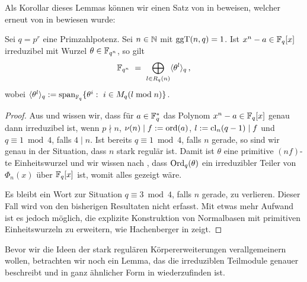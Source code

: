 Als Korollar dieses Lemmas können wir einen Satz von \citeauthor{semaev:1989}
\citeyear{semaev:1989} in 
\autocite{semaev:1989} beweisen, welcher erneut von \citeauthor{gao:1997}
\citeyear{gao:1997} in \autocite{gao:1997} bewiesen wurde:

\begin{satz}
  \label{satz:gao1}
  Sei $q = p^r$ eine Primzahlpotenz. Sei $n \in \mathbb{N}$ mit $\operatorname{ggT}(n,q)=1$.
  Ist $x^n - a \in \mathbb{F}_q[x]$ irreduzibel mit Wurzel $\theta\in \mathbb{F}_{q^n}$, so
  gilt 
  \[ \mathbb{F}_{q^n} \ =\  \bigoplus_{l\in R_q(n)} \langle \theta^l\rangle_q\,,\]
  wobei $\langle \theta^l\rangle_q := 
  \operatorname{span}_{\mathbb{F}_q}\{ \theta^i:\ i\in M_q(l\bmod n)\}$.
\end{satz}
\begin{proof}
  Aus  und 
  wissen wir, dass für $a \in \mathbb{F}_q^\ast$ das Polynom
  $x^n-a \in \mathbb{F}_q[x]$ genau dann irreduzibel ist, wenn
  $p\nmid n$, $\nu(n) \mid f := \operatorname{ord}(a)$, $l := \operatorname{cl}_n(q-1)\mid f$ und
  $q \equiv 1 \bmod 4$, falls $4\mid n$. 
  Ist bereits $q\equiv 1 \bmod 4$, falls $n$ gerade, so sind wir genau in der 
  Situation, dass $n$ stark regulär ist.
  Damit ist $\theta$ eine primitive $(nf)$-te Einheitswurzel und wir wissen
  nach , dass
  $\operatorname{Ord}_q(\theta)$ ein irreduzibler Teiler von $\Phi_n(x)$ über $\mathbb{F}_q[x]$ ist,
  womit alles gezeigt wäre.

  Es bleibt ein Wort zur Situation $q\equiv 3 \bmod 4$, falls $n$ gerade, zu
  verlieren. Dieser Fall wird von den bisherigen Resultaten nicht erfasst.
  Mit etwas mehr Aufwand ist es jedoch möglich, die explizite Konstruktion 
  von Normalbasen mit primitiven Einheitswurzeln zu erweitern, wie Hachenberger
  in \autocite[Section 22]{hachenberger1997finite} zeigt.
\end{proof}

Bevor wir die Ideen der stark regulären Körpererweiterungen verallgemeinern
wollen, betrachten wir noch ein Lemma, das die irreduziblen Teilmodule genauer
beschreibt und in ganz ähnlicher Form in \autocite[Theorem
22.5]{hachenberger1997finite} wiederzufinden ist.

